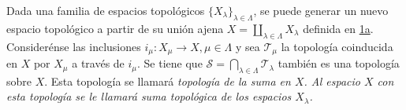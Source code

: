 
\begin{definition}
Dada una familia de espacios topológicos $\{ X_{\lambda} \}_{\lambda \in \Lambda}$, se puede generar un nuevo espacio topológico a partir de su unión ajena $X = \coprod_{\lambda \in \Lambda} X_{\lambda}$ definida en \hyperref[card:1a]{\textsf{1a}}. Considerénse las inclusiones $i_{\mu} : X_{\mu} \longrightarrow X, \mu \in \Lambda$ y sea $\mathcal{T}_{\mu}$ la topología coinducida en $X$ por $X_{\mu}$ a través de $i_{\mu}$. Se tiene que $\mathcal{S} = \bigcap_{\lambda \in \Lambda} \mathcal{T}_{\lambda}$ también es una topología sobre $X$. Esta topología se llamará \itshape{topología de la suma} en $X$. Al espacio $X$ con esta topología se le llamará \itshape{suma topológica} de los espacios $X_{\lambda}$.
\end{definition}
